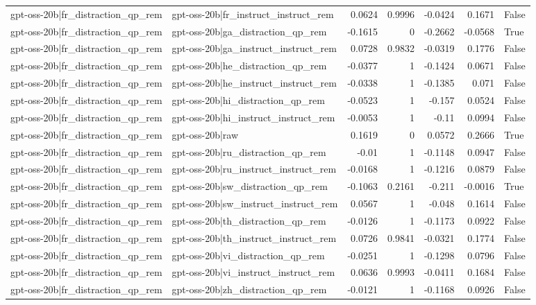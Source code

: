 \begin{table}
\begin{tabular}{l l r r r r l}
gpt-oss-20b|fr_distraction_qp_rem & gpt-oss-20b|fr_instruct_instruct_rem & 0.0624 & 0.9996 & -0.0424 & 0.1671 & False \\
gpt-oss-20b|fr_distraction_qp_rem & gpt-oss-20b|ga_distraction_qp_rem & -0.1615 & 0 & -0.2662 & -0.0568 & True \\
gpt-oss-20b|fr_distraction_qp_rem & gpt-oss-20b|ga_instruct_instruct_rem & 0.0728 & 0.9832 & -0.0319 & 0.1776 & False \\
gpt-oss-20b|fr_distraction_qp_rem & gpt-oss-20b|he_distraction_qp_rem & -0.0377 & 1 & -0.1424 & 0.0671 & False \\
gpt-oss-20b|fr_distraction_qp_rem & gpt-oss-20b|he_instruct_instruct_rem & -0.0338 & 1 & -0.1385 & 0.071 & False \\
gpt-oss-20b|fr_distraction_qp_rem & gpt-oss-20b|hi_distraction_qp_rem & -0.0523 & 1 & -0.157 & 0.0524 & False \\
gpt-oss-20b|fr_distraction_qp_rem & gpt-oss-20b|hi_instruct_instruct_rem & -0.0053 & 1 & -0.11 & 0.0994 & False \\
gpt-oss-20b|fr_distraction_qp_rem & gpt-oss-20b|raw & 0.1619 & 0 & 0.0572 & 0.2666 & True \\
gpt-oss-20b|fr_distraction_qp_rem & gpt-oss-20b|ru_distraction_qp_rem & -0.01 & 1 & -0.1148 & 0.0947 & False \\
gpt-oss-20b|fr_distraction_qp_rem & gpt-oss-20b|ru_instruct_instruct_rem & -0.0168 & 1 & -0.1216 & 0.0879 & False \\
gpt-oss-20b|fr_distraction_qp_rem & gpt-oss-20b|sw_distraction_qp_rem & -0.1063 & 0.2161 & -0.211 & -0.0016 & True \\
gpt-oss-20b|fr_distraction_qp_rem & gpt-oss-20b|sw_instruct_instruct_rem & 0.0567 & 1 & -0.048 & 0.1614 & False \\
gpt-oss-20b|fr_distraction_qp_rem & gpt-oss-20b|th_distraction_qp_rem & -0.0126 & 1 & -0.1173 & 0.0922 & False \\
gpt-oss-20b|fr_distraction_qp_rem & gpt-oss-20b|th_instruct_instruct_rem & 0.0726 & 0.9841 & -0.0321 & 0.1774 & False \\
gpt-oss-20b|fr_distraction_qp_rem & gpt-oss-20b|vi_distraction_qp_rem & -0.0251 & 1 & -0.1298 & 0.0796 & False \\
gpt-oss-20b|fr_distraction_qp_rem & gpt-oss-20b|vi_instruct_instruct_rem & 0.0636 & 0.9993 & -0.0411 & 0.1684 & False \\
gpt-oss-20b|fr_distraction_qp_rem & gpt-oss-20b|zh_distraction_qp_rem & -0.0121 & 1 & -0.1168 & 0.0926 & False \\

\end{tabular}
\end{table}
